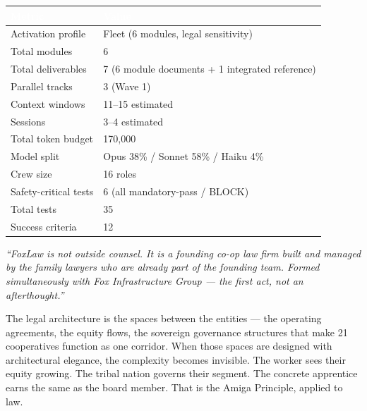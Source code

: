 \documentclass[11pt,letterpaper]{article}
\newcommand{\tableheader}[1]{\textbf{\sffamily\textcolor{white}{#1}}}
\begin{document}
\begin{center}
\begin{tabularx}{\textwidth}{L{5cm}X}
\toprule
{}
\tableheader{Metric} & \tableheader{Value} \\
\midrule
Activation profile & Fleet (6 modules, legal sensitivity) \\
Total modules & 6 \\
Total deliverables & 7 (6 module documents + 1 integrated reference) \\
Parallel tracks & 3 (Wave 1) \\
Context windows & 11--15 estimated \\
Sessions & 3--4 estimated \\
Total token budget & 170,000 \\
Model split & Opus 38\% / Sonnet 58\% / Haiku 4\% \\
Crew size & 16 roles \\
Safety-critical tests & 6 (all mandatory-pass / BLOCK) \\
Total tests & 35 \\
Success criteria & 12 \\
\bottomrule
\end{tabularx}
\end{center}

\vspace{1em}

\begin{quotebox}
\textit{``FoxLaw is not outside counsel. It is a founding co-op law firm built and managed by the family lawyers who are already part of the founding team. Formed simultaneously with Fox Infrastructure Group --- the first act, not an afterthought.''}

\vspace{0.5em}

The legal architecture is the spaces between the entities --- the operating agreements, the equity flows, the sovereign governance structures that make 21 cooperatives function as one corridor. When those spaces are designed with architectural elegance, the complexity becomes invisible. The worker sees their equity growing. The tribal nation governs their segment. The concrete apprentice earns the same as the board member. That is the Amiga Principle, applied to law.
\end{quotebox}
\end{document}
